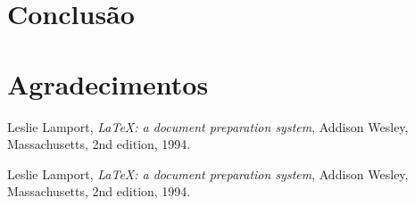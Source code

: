 \documentclass[10pt,twoside,a4paper]{article}
\begin{document}
\section{Conclusão} %
\lipsum[8-9]

\section{Agradecimentos} %
\lipsum[4]


\begin{thebibliography}{9} %

  Leslie Lamport,
  \emph{\LaTeX: a document preparation system},
  Addison Wesley, Massachusetts,
  2nd edition,
  1994.

  Leslie Lamport,
  \emph{\LaTeX: a document preparation system},
  Addison Wesley, Massachusetts,
  2nd edition,
  1994.

\end{thebibliography}

\end{document}
